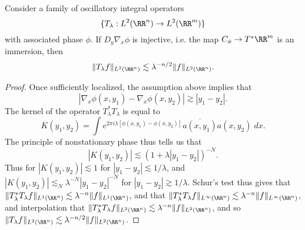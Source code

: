 
\begin{theorem} Consider a family of oscillatory integral operators
%
\[ \{ T_\lambda: L^2(\RR^n) \to L^2(\RR^m) \} \]
%
with associated phase $\phi$. If $D_y \nabla_x \phi$ is injective, i.e. the map $C_\phi \to T^* \RR^m$ is an immersion, then
%
\[ \| T_\lambda f \|_{L^2(\RR^n)} \lesssim \lambda^{-n/2} \| f \|_{L^2(\RR^n)}. \]
\end{theorem}
\begin{proof}
    Once sufficiently localized, the assumption above implies that
    \[ |\nabla_x \phi(x,y_1) - \nabla_x \phi(x,y_2)| \gtrsim |y_1 - y_2|. \]
    The kernel of the operator $T_\lambda^* T_\lambda$ is equal to
    \[ K(y_1,y_2) = \int e^{2 \pi i \lambda [\phi(x,y_1) - \phi(x,y_2)]} \overline{a(x,y_1)} a(x,y_2)\; dx. \]
    The principle of nonstationary phase thus tells us that
    \[ |K(y_1,y_2)| \lesssim (1 + \lambda |y_1 - y_2|)^{-N}. \]
    Thus for $|K(y_1,y_2)| \lesssim 1$ for $|y_1 - y_2| \lesssim 1/\lambda$, and $|K(y_1,y_2)| \lesssim_N \lambda^{-N} |y_1 - y_2|^{-N}$ for $|y_1 - y_2| \gtrsim 1/\lambda$. Schur's test thus gives that $\| T_\lambda^* T_\lambda f \|_{L^1(\RR^n)} \lesssim \lambda^{-n} \| f \|_{L^1(\RR^n)}$, and that $\| T_\lambda^* T_\lambda f \|_{L^\infty(\RR^n)} \lesssim \lambda^{-n} \| f \|_{L^\infty(\RR^n)}$, and interpolation that $\| T_\lambda^* T_\lambda f \|_{L^2(\RR^n)} \lesssim \lambda^{-n} \| f \|_{L^2(\RR^n)}$, and so $\| T_\lambda f \|_{L^2(\RR^n)} \lesssim \lambda^{-n/2} \| f \|_{L^2(\RR^n)}$.
\end{proof}

